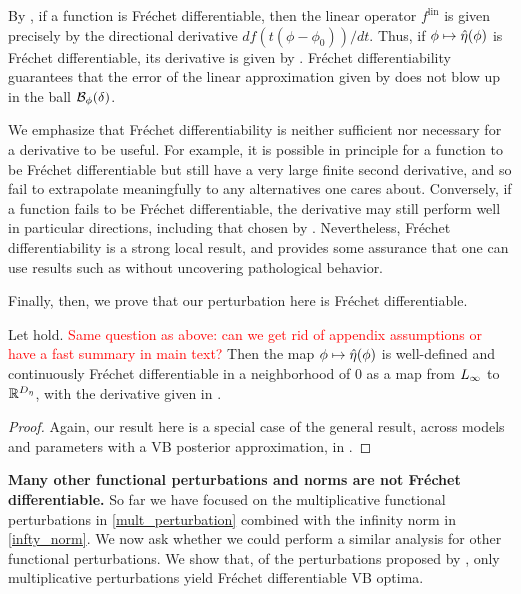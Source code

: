 By \citep[Proposition 4.8]{zeidler:2013:functional}, if a function is
Fr{\'e}chet differentiable, then the linear operator $f^{\mathrm{lin}}$ is given
precisely by the directional derivative $d f(t (\phi - \phi_0)) / d t$. Thus, if
$\phi \mapsto \hat\eta(\phi)$ is Fr{\'e}chet differentiable, its derivative is
given by .  Fr{\'e}chet differentiability guarantees
that the error of the linear approximation given by 
does not blow up in the ball $\mathcal{B}_\phi(\delta)$.

We emphasize that Fr{\'e}chet differentiability is neither sufficient nor
necessary for a derivative to be useful.  For example, it is possible in
principle for a function to be Fr{\'e}chet differentiable but still have a very
large finite second derivative, and so fail to extrapolate meaningfully to any
alternatives one cares about.  Conversely, if a function fails to be Fr{\'e}chet
differentiable, the derivative may still perform well in particular directions,
including that chosen by .  Nevertheless, Fr{\'e}chet
differentiability is a strong local result, and provides some assurance that one
can use results such as  without uncovering
pathological behavior.

Finally, then, we prove that our perturbation here is Fr{\'e}chet differentiable.
\begin{thm}
%
Let  hold. \textcolor{red}{Same question as above: can we get rid of appendix assumptions or have a fast summary in main text?} Then the map $\phi \mapsto
\hat\eta(\phi)$ is well-defined and continuously Fr{\'e}chet differentiable in a
neighborhood of $0$ as a map from ${L_{\infty}}$ to $\mathbb{R}^{D_{\eta}}$, with the
derivative given in .
\end{thm}
%
\begin{proof}
Again, our result here is a special case of the general result, across models and parameters with a VB posterior approximation, in 
.
\end{proof}

\noindent \textbf{Many other functional perturbations and norms are not Fr{\'e}chet differentiable.}
%
So far we have focused on the multiplicative functional perturbations in \eqref{mult_perturbation} combined with the infinity
norm in \eqref{infty_norm}. We now ask whether we could perform a similar analysis for other functional perturbations. We show that, of the perturbations proposed by \citet{gustafson:1996:local}, only 
multiplicative perturbations yield Fr{\'e}chet
differentiable VB optima.

